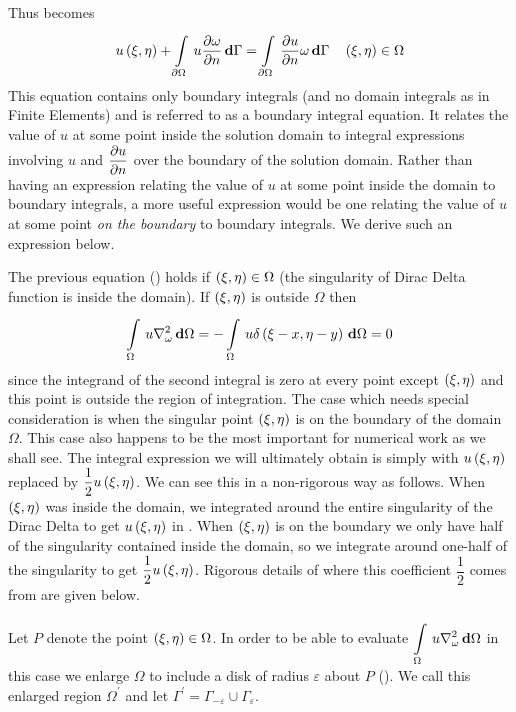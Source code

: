 Thus  becomes
\begin{equation}
   u\left( \xi,\eta \right)  +   \displaystyle\int\limits_{\partial\Omega}^{} \,u  \dfrac{\partial \omega}{\partial n} \, \boldsymbol{\mathrm{d}} \Gamma  =
    \displaystyle\int\limits_{\partial \Omega}^{} \, \dfrac{\partial u}{\partial n}  \omega\, \boldsymbol{\mathrm{d}} \Gamma  \quad \left( \xi,\eta \right) \in
  \Omega
  \label{eqn:seq2}
\end{equation}
This equation contains only boundary integrals (and no domain integrals as in
Finite Elements) and is referred to as a boundary integral equation.  It
relates the value of $u$ at some point inside the solution domain to integral
expressions involving $u$ and $ \dfrac{\partial u}{\partial n} $ over the boundary of the solution
domain.  Rather than having an expression relating the value of $u$ at some
point inside the domain to boundary integrals, a more useful expression would
be one relating the value of $u$ at some point \emph{on the boundary} to
boundary integrals.  We derive such an expression below.

The previous equation () holds if $\left( \xi,\eta \right) \in
\Omega$ (\ie the singularity of Dirac Delta function is inside the domain). If
$\left( \xi,\eta \right)$ is outside $\Omega$ then
\begin{equation*}
  \goneint{u \laplacian{\omega}}{\Omega}  = 
  - \goneint{u\fnof{\delta}{\xi - x,\eta - y}}{\Omega} = 0
\end{equation*}
since the integrand of the second integral is zero at every point except
$\left( \xi,\eta \right)$ and this point is outside the region of integration.  The
case which needs special consideration is when the singular point
$\left( \xi,\eta \right)$ is on the boundary of the domain $\Omega$.  This case also
happens to be the most important for numerical work as we shall see.  The
integral expression we will ultimately obtain is simply  with
$ u\left( \xi,\eta \right) $ replaced by $\dfrac{1}{2}  u\left( \xi,\eta \right) $.  We can
see this in a non-rigorous way as follows.  When $\left( \xi,\eta \right)$ was inside
the domain, we integrated around the entire singularity of the Dirac Delta to
get $ u\left( \xi,\eta \right) $ in .  When $\left( \xi,\eta \right)$ is on
the boundary we only have half of the singularity contained inside the domain,
so we integrate around one-half of the singularity to get $\dfrac{1}{2}
 u\left( \xi,\eta \right) $.  Rigorous details of where this coefficient
$\dfrac{1}{2}$ comes from are given below.

Let $P$ denote the point $\left( \xi,\eta \right) \in \Omega$.  In order to be able to
evaluate $\goneint{u \laplacian{\omega}}{\Omega}$ in this case we
enlarge $\Omega$ to include a disk of radius $\varepsilon$ about $P$
().  We call this enlarged region $\Omega^{\prime}$ and
let $\Gamma^{\prime} = \Gamma_{-\varepsilon} \cup \Gamma_{\varepsilon}$.

